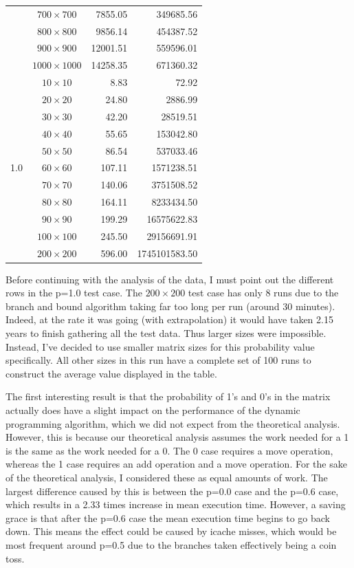 \documentclass{article}
\begin{document}
\begin{longtable}{|c|c|r|r|}
&$700\times700$ & 7855.05 & 349685.56\\*
&$800\times800$ & 9856.14 & 454387.52\\*
&$900\times900$ & 12001.51 & 559596.01\\*
&$1000\times1000$ & 14258.35 & 671360.32\\
\hline
\multirow{11}{*}{1.0}
&$10\times10$ & 8.83 & 72.92\\*
&$20\times20$ & 24.80 & 2886.99\\*
&$30\times30$ & 42.20 & 28519.51\\*
&$40\times40$ & 55.65 & 153042.80\\*
&$50\times50$ & 86.54 & 537033.46\\*
&$60\times60$ & 107.11 & 1571238.51\\*
&$70\times70$ & 140.06 & 3751508.52\\*
&$80\times80$ & 164.11 & 8233434.50\\*
&$90\times90$ & 199.29 & 16575622.83\\*
&$100\times100$ & 245.50 & 29156691.91\\*
&$200\times200$ & 596.00 & 1745101583.50\\
\hline

\end{longtable}
\FloatBarrier

Before continuing with the analysis of the data, I must point out the different rows in the p=1.0 test case.
The $200\times200$ test case has only 8 runs due to the branch and bound algorithm taking far too long per run (around 30 minutes).
Indeed, at the rate it was going (with extrapolation) it would have taken 2.15 years to finish gathering all the test data.
Thus larger sizes were impossible.
Instead, I've decided to use smaller matrix sizes for this probability value specifically.
All other sizes in this run have a complete set of 100 runs to construct the average value displayed in the table.

The first interesting result is that the probability of 1's and 0's in the matrix actually does have a slight impact on the performance of the dynamic programming algorithm, which we did not expect from the theoretical analysis.
However, this is because our theoretical analysis assumes the work needed for a 1 is the same as the work needed for a 0.
The 0 case requires a move operation, whereas the 1 case requires an add operation and a move operation.
For the sake of the theoretical analysis, I considered these as equal amounts of work.
The largest difference caused by this is between the p=0.0 case and the p=0.6 case, which results in a 2.33 times increase in mean execution time.
However, a saving grace is that after the p=0.6 case the mean execution time begins to go back down.
This means the effect could be caused by icache misses, which would be most frequent around p=0.5 due to the branches taken effectively being a coin toss.
\end{document}
